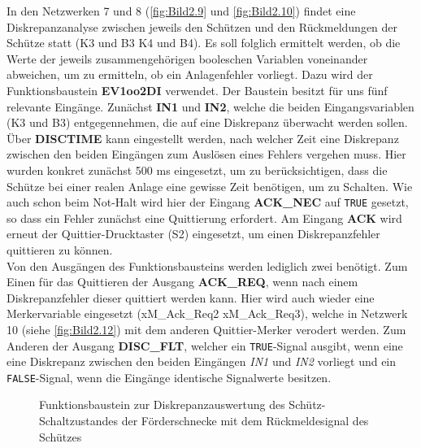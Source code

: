 In den Netzwerken 7 und 8 (\autoref{fig:Bild2.9} und \autoref{fig:Bild2.10}) findet eine Diskrepanzanalyse zwischen jeweils den Schützen und den Rückmeldungen der Schütze statt (K3 und B3 \bzw K4 und B4). Es soll folglich ermittelt werden, ob die Werte der jeweils zusammengehörigen booleschen Variablen voneinander abweichen, um zu ermitteln, ob ein Anlagenfehler vorliegt. Dazu wird der Funktionsbaustein \textbf{EV1oo2DI} verwendet. Der Baustein besitzt für uns fünf relevante Eingänge. Zunächst \textbf{IN1} und \textbf{IN2}, welche die beiden Eingangsvariablen (\zB K3 und B3) entgegennehmen, die auf eine Diskrepanz überwacht werden sollen. Über \textbf{DISCTIME} kann eingestellt werden, nach welcher Zeit eine Diskrepanz zwischen den beiden Eingängen zum Auslösen eines Fehlers vergehen muss. Hier wurden konkret zunächst 500 ms eingesetzt, um zu berücksichtigen, dass die Schütze bei einer realen Anlage eine gewisse Zeit benötigen, um zu Schalten. Wie auch schon beim Not-Halt wird hier der Eingang \textbf{ACK\_NEC} auf \texttt{TRUE} gesetzt, so dass ein Fehler zunächst eine Quittierung erfordert. Am Eingang \textbf{ACK} wird erneut der Quittier-Drucktaster (S2) eingesetzt, um einen Diskrepanzfehler quittieren zu können. \\
Von den Ausgängen des Funktionsbausteins werden lediglich zwei benötigt. Zum Einen für das Quittieren der Ausgang \textbf{ACK\_REQ}, wenn nach einem Diskrepanzfehler dieser quittiert werden kann. Hier wird auch wieder eine Merkervariable eingesetzt (xM\_Ack\_Req2 \bzw xM\_Ack\_Req3), welche in Netzwerk 10 (siehe \autoref{fig:Bild2.12}) mit dem anderen Quittier-Merker verodert werden. Zum Anderen der Ausgang \textbf{DISC\_FLT}, welcher ein \texttt{TRUE}-Signal ausgibt, wenn eine eine Diskrepanz zwischen den beiden Eingängen \textit{IN1} und \textit{IN2} vorliegt und ein \texttt{FALSE}-Signal, wenn die Eingänge identische Signalwerte besitzen.

\begin{figure}[H]
   \centering
   \caption[Diskrepanzauswertung Schütz Förderschnecke]{Funktionsbaustein zur Diskrepanzauswertung des Schütz-Schaltzustandes der Förderschnecke mit dem Rückmeldesignal des Schützes}
   \label{fig:Bild2.9}
\end{figure}

